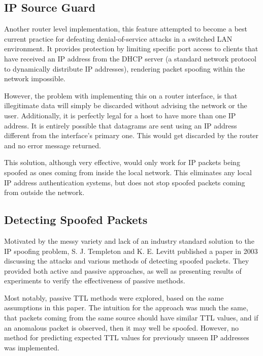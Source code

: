 \documentclass[twocolumn,10pt]{asme2ej}
\begin{document}
\subsection{IP Source Guard \cite{ipsourceguard}}

Another router level implementation, this feature attempted to become a best current practice for defeating denial-of-service attacks in a switched LAN environment. It provides protection by limiting specific port access to clients that have received an IP address from the DHCP server (a standard network protocol to dynamically distribute IP addresses), rendering packet spoofing within the network impossible. 

However, the problem with implementing this on a router interface, is that illegitimate data will simply be discarded without advising the network or the user. Additionally, it is perfectly legal for a host to have more than one IP address. It is entirely possible that datagrams are sent using an IP address different from the interface's primary one. This would get discarded by the router and no error message returned.

This solution, although very effective, would only work for IP packets being spoofed as ones coming from inside the local network. This eliminates any local IP address authentication systems, but does not stop spoofed packets coming from outside the network.


\subsection{Detecting Spoofed Packets \cite{dsp}}

Motivated by the messy variety and lack of an industry standard solution to the IP spoofing problem, S. J. Templeton and K. E. Levitt published a paper in 2003 discussing the attacks and various methods of detecting spoofed packets. They provided both active and passive approaches, as well as presenting results of experiments to verify the effectiveness of passive methods. 

Most notably, passive TTL methods were explored, based on the same assumptions in this paper. The intuition for the approach was much the same, that packets coming from the same source should have similar TTL values, and if an anomalous packet is observed, then it may well be spoofed. However, no method for predicting expected TTL values for previously unseen IP addresses was implemented.
\end{document}
